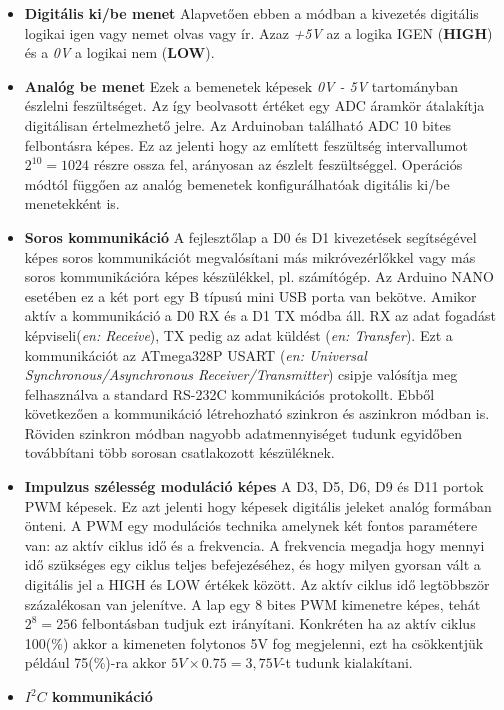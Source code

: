 \documentclass[a4paper,12pt]{article}
\begin{document}
\begin{itemize}
	\item \textbf{Digitális ki/be menet}
	Alapvetően ebben a módban a kivezetés digitális logikai igen vagy nemet olvas vagy ír.
	Azaz \textit{+5V } az a logika IGEN (\textbf{HIGH}) és a \textit{0V} a logikai nem (\textbf{LOW}).
	\item \textbf{Analóg be menet}
	Ezek a bemenetek képesek \textit{0V - 5V} tartományban észlelni feszültséget.
	Az így beolvasott értéket egy ADC áramkör átalakítja digitálisan értelmezhető jelre.
	Az Arduinoban található ADC 10 bites felbontásra képes. 
	Ez az jelenti hogy az említett feszültség intervallumot $2^{10} = 1024$ részre ossza fel, arányosan az észlelt feszültséggel.
	Operációs módtól függően az analóg bemenetek konfigurálhatóak digitális ki/be menetekként is.
	\item \textbf{Soros kommunikáció}
	A fejlesztőlap a D0 és D1 kivezetések segítségével képes soros kommunikációt megvalósítani más mikróvezérlőkkel vagy más soros kommunikációra képes készülékkel, pl. számítógép.
	Az Arduino NANO esetében ez a két port egy B típusú mini USB porta van bekötve.
	Amikor aktív a kommunikáció a D0 RX és a D1 TX módba áll.
	RX az adat fogadást képviseli(\textit{en: Receive}), TX pedig az adat küldést (\textit{en: Transfer}).
	Ezt a kommunikációt az ATmega328P USART (\textit{en: Universal Synchronous/Asynchronous Receiver/Transmitter}) csipje valósítja meg felhasználva a standard RS-232C kommunikációs protokollt.
	Ebből következően a kommunikáció létrehozható szinkron és aszinkron módban is. 
	Röviden szinkron módban nagyobb adatmennyiséget tudunk egyidőben továbbítani több sorosan csatlakozott készüléknek.	
	\item \textbf{Impulzus szélesség moduláció képes}
	A D3, D5, D6, D9 és D11 portok PWM képesek. Ez azt jelenti hogy képesek digitális jeleket analóg formában önteni.
	A PWM egy modulációs technika amelynek két fontos paramétere van: az aktív ciklus idő és a frekvencia.
	A frekvencia megadja hogy mennyi idő szükséges egy ciklus teljes befejezéséhez, és hogy milyen gyorsan vált a digitális jel a HIGH és LOW értékek között.
	Az aktív ciklus idő legtöbbször százalékosan van jelenítve. A lap egy 8 bites PWM kimenetre képes, tehát $2^{8} = 256$ felbontásban tudjuk ezt irányítani.
	Konkréten ha az aktív ciklus 100(\%) akkor a kimeneten folytonos 5V fog megjelenni, ezt ha csökkentjük például 75(\%)-ra akkor $5V \times 0.75 = 3,75 V$-t tudunk kialakítani.
	\item \textbf{$I^{2}C$ kommunikáció}

\end{itemize}
\end{document}
